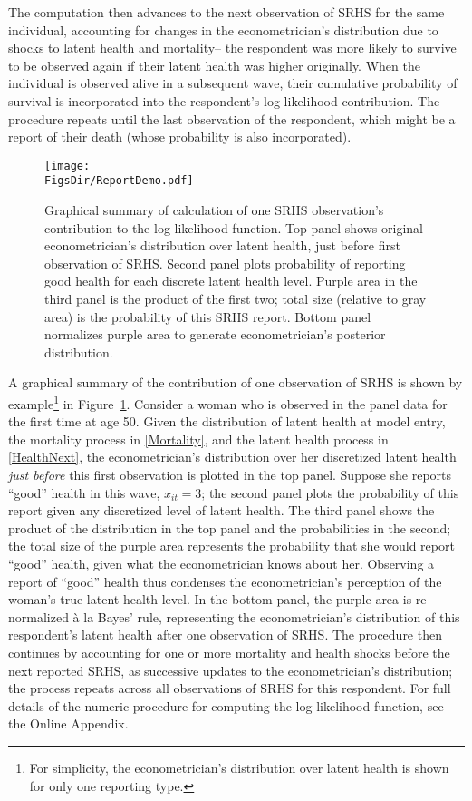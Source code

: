 \documentclass[12pt,pdftex,letterpaper]{article}
\newcommand{\Report}{x}
\newcommand{\RootDir}{..}
\newcommand{\FigsDir}{\RootDir/Figures}
\begin{document}
The computation then advances to the next observation of SRHS for the same individual, accounting for changes in the econometrician's distribution due to shocks to latent health and mortality-- the respondent was more likely to survive to be observed again if their latent health was higher originally. When the individual is observed alive in a subsequent wave, their cumulative probability of survival is incorporated into the respondent's log-likelihood contribution. The procedure repeats until the last observation of the respondent, which might be a report of their death (whose probability is also incorporated).

\begin{figure}[h!]
	\centering
	\texttt{[image: \\FigsDir/ReportDemo.pdf]}
	\caption{Graphical summary of calculation of one SRHS observation's contribution to the log-likelihood function. Top panel shows original econometrician's distribution over latent health, just before first observation of SRHS. Second panel plots probability of reporting good health for each discrete latent health level. Purple area in the third panel is the product of the first two; total size (relative to gray area) is the probability of this SRHS report. Bottom panel normalizes purple area to generate econometrician's posterior distribution.}\label{fig:ReportDemo}
\end{figure}

A graphical summary of the contribution of one observation of SRHS is shown by example\footnote{For simplicity, the econometrician's distribution over latent health is shown for only one reporting type.} in Figure~\ref{fig:ReportDemo}. Consider a woman who is observed in the panel data for the first time at age 50. Given the distribution of latent health at model entry, the mortality process in \eqref{Mortality}, and the latent health process in \eqref{HealthNext}, the econometrician's distribution over her discretized latent health \textit{just before} this first observation is plotted in the top panel. Suppose she reports ``good'' health in this wave, $\Report_{it}=3$; the second panel plots the probability of this report given any discretized level of latent health. The third panel shows the product of the distribution in the top panel and the probabilities in the second; the total size of the purple area represents the probability that she would report ``good'' health, given what the econometrician knows about her. Observing a report of ``good'' health thus condenses the econometrician's perception of the woman's true latent health level. In the bottom panel, the purple area is re-normalized \`{a} la Bayes' rule, representing the econometrician's distribution of this respondent's latent health after one observation of SRHS. The procedure then continues by accounting for one or more mortality and health shocks before the next reported SRHS, as successive updates to the econometrician's distribution; the process repeats across all observations of SRHS for this respondent. For full details of the numeric procedure for computing the log likelihood function, see the Online Appendix.
\end{document}
